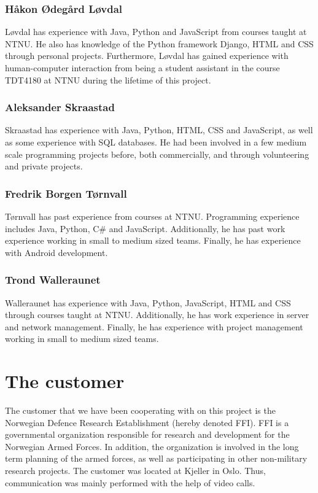 \subsubsection{Håkon Ødegård Løvdal}

Løvdal has experience with Java, Python and JavaScript from courses taught at NTNU. He also has knowledge of the Python framework Django, HTML and CSS through personal projects. Furthermore, Løvdal has gained experience with human-computer interaction from being a student assistant in the course TDT4180 at NTNU during the lifetime of this project. 

\subsubsection{Aleksander Skraastad}

Skraastad has experience with Java, Python, HTML, CSS and JavaScript, as well as some experience with SQL databases. He had been involved in a few medium scale programming projects before, both commercially, and through volunteering and private projects.

\subsubsection{Fredrik Borgen Tørnvall}

Tørnvall has past experience from courses at NTNU. Programming experience includes Java, Python, C\# and JavaScript. Additionally, he has past work experience working in small to medium sized teams. Finally, he has experience with Android development. 

\subsubsection{Trond Walleraunet}

Walleraunet has experience with Java, Python, JavaScript, HTML and CSS through courses taught at NTNU. Additionally, he has work experience in server and network management. Finally, he has experience with project management working in small to medium sized teams.


\section{The customer}
\label{sec:introduction-the_customer}

The customer that we have been cooperating with on this project is the Norwegian Defence Research Establishment (hereby denoted FFI). FFI is a governmental organization responsible for research and development for the Norwegian Armed Forces. In addition, the organization is involved in the long term planning of the armed forces, as well as participating in other non-military research projects. The customer was located at Kjeller in Oslo. Thus, communication was mainly performed with the help of video calls.

